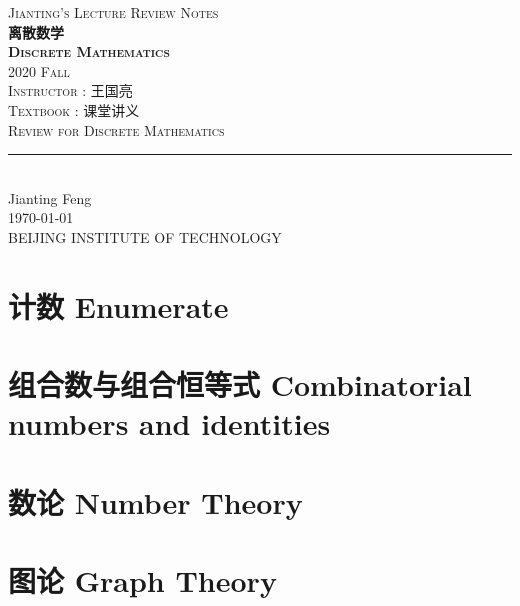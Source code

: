 \documentclass[11pt,titlepage]{report}
\begin{document}
\begin{titlepage}
	\centering
    \textsc{\LARGE Jianting's Lecture Review Notes}\\ \vspace{\fill}
    \textbf{\textsc{\fontsize{20}{20}\selectfont 离散数学\\ Discrete Mathematics}}\\ \vspace{\fill}
    \medskip
    \textsc{2020 Fall}\\
    \medskip
    \textsc{Instructor : 王国亮}\\
    \medskip
    \textsc{Textbook : 课堂讲义}\\
    \bigskip
	\textsc{Review for Discrete Mathematics}\\[0.4cm]
	\rule{\linewidth}{0.2 mm} \\[0.5 cm]
	Jianting Feng\\
	\today\\
	BEIJING INSTITUTE OF TECHNOLOGY
\end{titlepage}
\restoregeometry

\newpage
\begin{abstract}
	
\end{abstract}
\tableofcontents
\newpage
\thispagestyle{numberonly}
\chapter{计数 Enumerate}

\chapter{组合数与组合恒等式 Combinatorial numbers
and identities}

\chapter{数论 Number Theory}


\chapter{图论 Graph Theory}


\clearpage
\pagestyle{numberonly}
\printbibliography
\end{document}
